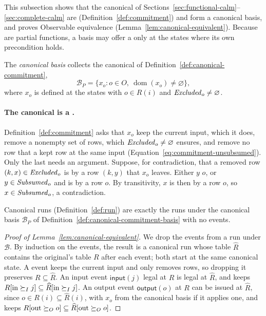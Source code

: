 This subsection shows that the canonical \commitments of
Sections~\ref{sec:functional-calm}--\ref{sec:complete-calm} are \commitments
(Definition~\ref{def:commitment}) and form a canonical basis, and proves
Observable equivalence (Lemma~\ref{lem:canonical-equivalent}).  Because
\commitments are partial functions, a basis may offer a \commitment only at the
states where its own precondition holds.

\begin{definition}
\label{def:canonical-commitment-basis}
The \emph{canonical \commitment basis} collects the canonical \commitments of
Definition~\ref{def:canonical-commitment},
\begin{equation}
  \mathcal B_P
    =\{x_o:o\in O,\ \operatorname{dom}(x_o)\neq\varnothing\},
  \label{eq:canonical-commitment-basis-relational}
\end{equation}
where $x_o$ is defined at the states with $o\in R(i)$ and $\mathit{Excluded}_o\neq\varnothing$.
\end{definition}

\paragraph{The canonical \commitment is a \commitment.}
Definition~\ref{def:commitment} asks that $x_o$ keep the current input, which
it does, remove a nonempty set of rows, which $\mathit{Excluded}_o\neq\varnothing$
ensures, and remove no row that a kept row at the same input \outrel
(Equation~\ref{eq:commitment-unsubsumed}).  Only the last needs an argument.
Suppose, for contradiction, that a removed row $(k,x)\in\mathit{Excluded}_o$ is
\outrelpast by a row $(k,y)$ that $x_o$ leaves.  Either $y$ \outrel $o$, or
$y\in\mathit{Subsumed}_o$ and is \outrelpast by a row \outrelpart $o$.  By
transitivity, $x$ is then \outrelpast by a row \outrelpart $o$, so
$x\in\mathit{Subsumed}_o$, a contradiction.

Canonical runs (Definition~\ref{def:run}) are exactly the runs under the
canonical basis $\mathcal B_P$ of Definition~\ref{def:canonical-commitment-basis}
with no \commitment events.

\begin{proof}[Proof of Lemma~\ref{lem:canonical-equivalent}]
We drop the \commitment events from a run under $\mathcal B$.  By induction on
the events, the result is a canonical run whose table $\widehat R$ contains
the original's table $R$ after each event; both start at the same canonical
state.  A \commitment event keeps the current input and only removes rows, so
dropping it preserves $R\subseteq\widehat R$.  An input event
$\mathsf{input}(j)$ legal at $R$ is legal at $\widehat R$, and keeps
$R[\mathrm{in}\succeq_I j]\subseteq\widehat R[\mathrm{in}\succeq_I j]$.  An
output event $\mathsf{output}(o)$ at $R$ can be issued at $\widehat R$, since
$o\in R(i)\subseteq\widehat R(i)$, with $x_o$ from the canonical basis if it
applies one, and keeps
$R[\mathrm{out}\succeq_O o]\subseteq\widehat R[\mathrm{out}\succeq_O o]$.
\end{proof}

